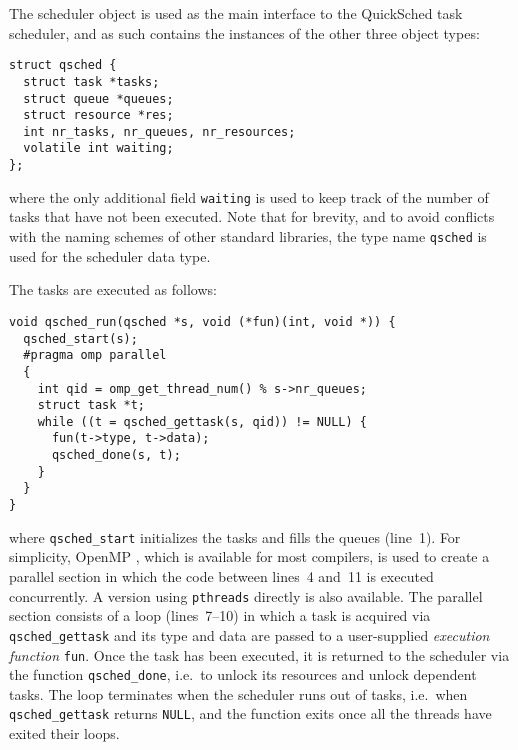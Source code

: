 \documentclass[preprint]{elsarticle}
\begin{document}
The scheduler object is used as the main interface to the
QuickSched task scheduler, and as such contains the instances
of the other three object types:
\begin{center}\begin{minipage}{0.9\textwidth}
    \begin{lstlisting}
struct qsched {
  struct task *tasks;
  struct queue *queues;
  struct resource *res;
  int nr_tasks, nr_queues, nr_resources;
  volatile int waiting;
};
    \end{lstlisting}
\end{minipage}\end{center}
\noindent where the only additional field {\tt waiting} is
used to keep track of the number of tasks that have not been
executed.
Note that for brevity, and to avoid conflicts with the naming
schemes of other standard libraries, the type name {\tt qsched}
is used for the scheduler data type.

The tasks are executed as follows:
\begin{center}\begin{minipage}{0.9\textwidth}
    \begin{lstlisting}
void qsched_run(qsched *s, void (*fun)(int, void *)) {
  qsched_start(s);
  #pragma omp parallel
  {
    int qid = omp_get_thread_num() % s->nr_queues;
    struct task *t;
    while ((t = qsched_gettask(s, qid)) != NULL) {
      fun(t->type, t->data);
      qsched_done(s, t);
    }
  }
}
    \end{lstlisting}
\end{minipage}\end{center}
\noindent where {\tt qsched\_start} initializes the tasks and
fills the queues (line~1).
For simplicity, OpenMP \cite{ref:Dagum1998}, which is available
for most compilers, is used to create a parallel section
in which the code between lines~4 and~11 is executed
concurrently.
A version using {\tt pthreads} \cite{ref:Pthreads1995}
directly is also available.
The parallel section consists of a loop (lines~7--10) in
which a task is acquired via {\tt qsched\_gettask}
and its type and data are passed to a user-supplied
{\em execution function} {\tt fun}.
Once the task has been executed, it is returned to the
scheduler via the function {\tt qsched\_done}, i.e.~to
unlock its resources and unlock dependent tasks.
The loop terminates when the scheduler runs out of tasks,
i.e.~when {\tt qsched\_gettask} returns {\tt NULL}, and
the function exits once all the threads have exited their
loops.
\end{document}
